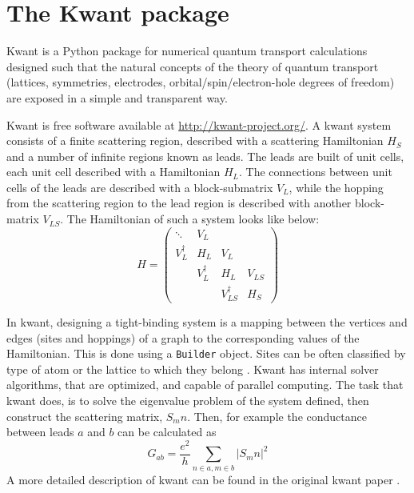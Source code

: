 \documentclass[11pt, a4paper, twocolumn]{article}
\begin{document}
\section*{The Kwant package}
Kwant is a Python package for numerical quantum transport calculations \cite{kwant-paper} 
designed such that the natural concepts of the theory of quantum transport (lattices, symmetries,
electrodes, orbital/spin/electron-hole degrees of freedom) are exposed in a simple and transparent way.

Kwant is free software available at \url{http://kwant-project.org/}. A kwant system consists of a finite scattering region,
described with a scattering Hamiltonian $H_S$ and a number of infinite regions known as leads.
The leads are built of unit cells, each unit cell described with a Hamiltonian $H_L$. The connections
between unit cells of the leads are described with a block-submatrix $V_L$, while the hopping from the scattering region
to the lead region is described with another block-matrix $V_{LS}$. The Hamiltonian of such a system looks like below:
\begin{equation*}
  H = \left(
    \begin{array}{cccc}
      \ddots     & V_L        &                  &        \\
      V_L^{\dag} & H_L        & V_L              &        \\
                 & V_L^{\dag} & H_L              &  V_{LS}\\
                 &            & V_{LS}^{\dag}    & H_S
    \end{array}
  \right)
\end{equation*}

\par In kwant, designing a tight-binding system is a mapping between the vertices and edges (sites and hoppings) of
a graph to the corresponding values of the Hamiltonian. This is done using a \texttt{Builder} object. Sites can
be often classified by type of atom or the lattice to which they belong \cite{kwant-paper}. Kwant has internal solver
algorithms, that are optimized, and capable of parallel computing. The task that kwant does, is to solve the eigenvalue 
problem of the system defined, then construct the scattering matrix, $S_mn$. Then, for example the conductance between
leads $a$ and $b$ can be calculated as
\begin{equation*}
  G_{ab} = \frac{e^2}{h}\sum\limits_{n\in a, m\in b}|S_mn|^2
\end{equation*}
A more detailed description of kwant can be found in the original kwant paper \cite{kwant-paper}.
\end{document}
